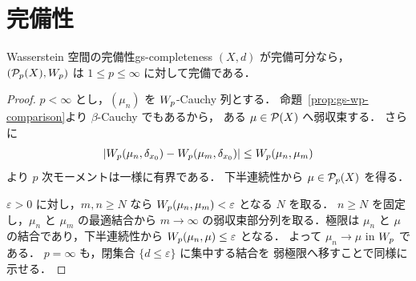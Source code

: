 \section{完備性}
\label{sec:completeness}

\begin{proposition}{Wasserstein 空間の完備性}{gs-completeness}
  $(X,d)$ が完備可分なら，
  $(\mathcal{P}_{p}(X),W_p)$ は $1\leq p\leq\infty$ に対して完備である．
\end{proposition}

\begin{proof}
  $p<\infty$ とし，$(\mu_n)$ を $W_p$-Cauchy 列とする．
  命題~\ref{prop:gs-wp-comparison}より $\beta$-Cauchy でもあるから，
  ある $\mu\in\mathcal{P}(X)$ へ弱収束する．
  さらに
  \[
    \lvert W_p(\mu_n,\delta_{x_0})
    -W_p(\mu_m,\delta_{x_0}) \rvert
    \leq W_p(\mu_n,\mu_m)
  \]
  より $p$ 次モーメントは一様に有界である．
  下半連続性から $\mu\in\mathcal{P}_{p}(X)$ を得る．

  $\varepsilon>0$ に対し，$m,n\geq N$ なら
  $W_p(\mu_n,\mu_m)<\varepsilon$ となる $N$ を取る．
  $n\geq N$ を固定し，$\mu_n$ と $\mu_m$ の最適結合から
  $m\to\infty$ の弱収束部分列を取る．極限は
  $\mu_n$ と $\mu$ の結合であり，下半連続性から
  $W_p(\mu_n,\mu)\leq\varepsilon$ となる．
  よって $\mu_n\to\mu$ in $W_p$ である．
  $p=\infty$ も，閉集合 $\{d\leq\varepsilon\}$ に集中する結合を
  弱極限へ移すことで同様に示せる．
\end{proof}

